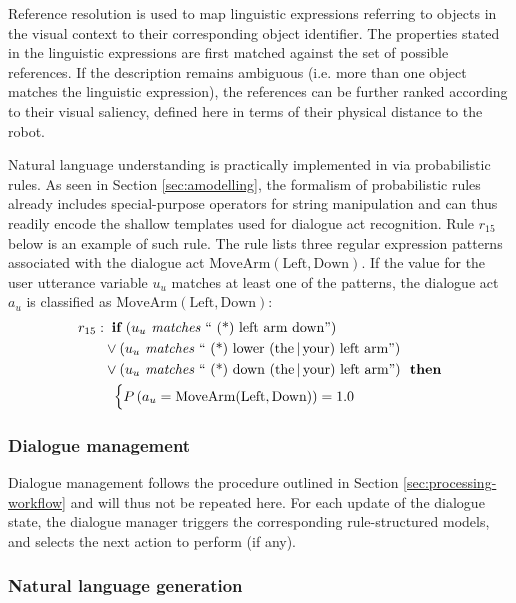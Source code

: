 Reference resolution is used to map linguistic expressions referring to objects in the visual context to their corresponding object identifier. The properties stated in the linguistic expressions are first matched against the set of possible references.  If the description remains ambiguous (i.e. more than one object matches the linguistic expression), the references can be further ranked according to their visual saliency, defined here in terms of their physical distance to the robot. 

Natural language understanding is practically implemented in \opendial via probabilistic rules.  As seen in Section \ref{sec:amodelling}, the formalism of probabilistic rules already includes special-purpose operators for string manipulation and can thus readily encode the shallow templates used for dialogue act recognition.  Rule $r_{15}$ below is an example of such rule.  The rule lists three regular expression patterns associated with the dialogue act $\mathrm{MoveArm(Left,Down)}$.  If the value for the user utterance variable $u_u$ matches at least one of the patterns, the dialogue act $a_u$ is classified as $\mathrm{MoveArm(Left,Down)}$:
\begin{align*}
r_{15}: &\;\;\textbf{if} \ (u_u \textit{ matches } \text{`` (*) left arm down''} ) \\ 
& \lor (u_u \textit{ matches } \text{`` (*) lower (the\,|\,your) left arm''} ) \\
& \lor (u_u \textit{ matches } \text{`` (*) down (the\,|\,your) left arm''}   )  \ \ \textbf{then} \\ 
& \; \; \begin{cases} P\left(a_u = \mathrm{MoveArm(Left,Down)}\right) = 1.0 \end{cases}
\end{align*}

\subsubsection*{Dialogue management}

Dialogue management follows the procedure outlined in Section \ref{sec:processing-workflow} and will thus not be repeated here. For each update of the dialogue state, the dialogue manager triggers the corresponding rule-structured models, and selects the next action to perform (if any). 

\subsubsection*{Natural language generation}

